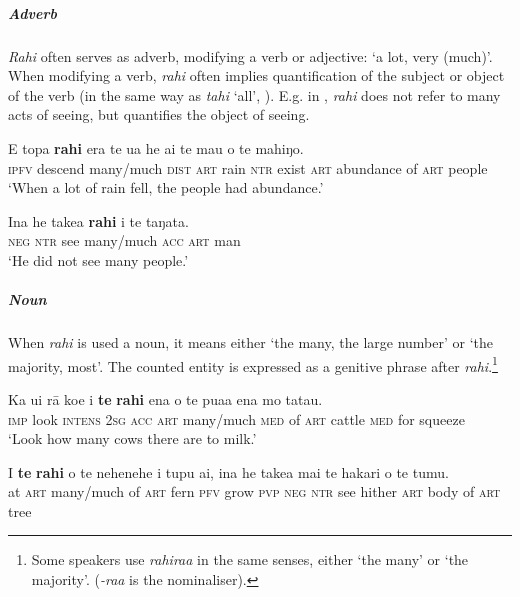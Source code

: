 \subparagraph{Adverb} \textit{Rahi} often serves as adverb, modifying a verb or adjective: ‘a lot, very (much)’. When modifying a verb, \textit{rahi} often implies quantification of the subject or object of the verb (in the same way as \textit{tahi} ‘all’, ). E.g. in , \textit{rahi} does not refer to many acts of seeing, but quantifies the object of seeing.

\ea\label{ex:4.97}
\gll E topa \textbf{rahi} era te {\ꞌ}ua he ai te mau o te mahiŋo. \\
\textsc{ipfv} descend many/much \textsc{dist} \textsc{art} rain \textsc{ntr} exist \textsc{art} abundance of \textsc{art} people \\

\glt 
‘When a lot of rain fell, the people had abundance.’ \textstyleExampleref{[Fel-19.006]}
\z

\ea\label{ex:4.98}
\gll {\ꞌ}Ina he take{\ꞌ}a \textbf{rahi} i te taŋata. \\
\textsc{neg} \textsc{ntr} see many/much \textsc{acc} \textsc{art} man \\

\glt 
‘He did not see many people.’ \textstyleExampleref{[R459.003]} 
\z

\subparagraph{Noun} When \textit{rahi} is used a noun, it means either ‘the many, the large number’ or ‘the majority, most’. The counted entity is expressed as a genitive phrase after \textit{rahi}.\footnote{\label{fn:187}Some speakers use \textit{rahira{\ꞌ}a} in the same senses, either ‘the many’ or ‘the majority’. (\textit{-ra{\ꞌ}a} is the  nominaliser).}

\ea\label{ex:4.99}
\gll Ka u{\ꞌ}i rā koe i \textbf{te} \textbf{rahi} ena o te pua{\ꞌ}a ena mo tatau. \\
\textsc{imp} look \textsc{intens} \textsc{2sg} \textsc{acc} \textsc{art} many/much \textsc{med} of \textsc{art} cattle \textsc{med} for squeeze \\

\glt 
‘Look how many cows there are to milk.’ \textstyleExampleref{[R245.186]} 
\z

\ea\label{ex:4.100}
\gll {\ꞌ}I \textbf{te} \textbf{rahi} o te nehenehe i tupu ai, {\ꞌ}ina he take{\ꞌ}a mai te hakari o te tumu.\\
at \textsc{art} many/much of \textsc{art} fern \textsc{pfv} grow \textsc{pvp} \textsc{neg} \textsc{ntr} see hither \textsc{art} body of \textsc{art} tree\\

